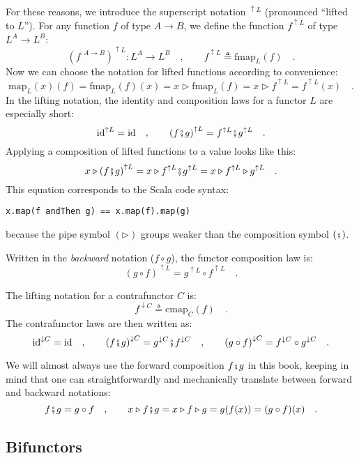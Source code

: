 For these reasons, we introduce the superscript notation $^{\uparrow L}$
(pronounced \textsf{``}lifted to $L$\textsf{''}). For any function $f$ of type $A\rightarrow B$,
we define the function $f^{\uparrow L}$ of type $L^{A}\rightarrow L^{B}$:
\[
(f^{:A\rightarrow B})^{\uparrow L}:L^{A}\rightarrow L^{B}\quad,\quad\quad f^{\uparrow L}\triangleq\text{fmap}_{L}(f)\quad.
\]
Now we can choose the notation for lifted functions according to convenience:
\[
\text{map}_{L}(x)(f)=\text{fmap}_{L}(f)(x)=x\triangleright\text{fmap}_{L}(f)=x\triangleright f^{\uparrow L}=f^{\uparrow L}(x)\quad.
\]
In the lifting notation,
the identity and composition laws for a functor $L$ are especially
short:
\[
\text{id}^{\uparrow L}=\text{id}\quad,\quad\quad\left(f\bef g\right)^{\uparrow L}=f^{\uparrow L}\bef g^{\uparrow L}\quad.
\]
Applying a composition of lifted functions to a value looks like this:
\[
x\triangleright\left(f\bef g\right)^{\uparrow L}=x\triangleright f^{\uparrow L}\bef g^{\uparrow L}=x\triangleright f^{\uparrow L}\triangleright g^{\uparrow L}\quad.
\]
This equation corresponds to the Scala code syntax:
\begin{lstlisting}
x.map(f andThen g) == x.map(f).map(g)
\end{lstlisting}
because the pipe symbol $\left(\triangleright\right)$ groups weaker
than the composition symbol $\left(\bef\right)$.

Written in the \emph{backward} notation ($f\circ g$), the functor
composition law is:
\[
\left(g\circ f\right)^{\uparrow L}=g^{\uparrow L}\circ f^{\uparrow L}\quad.
\]

The lifting notation for a contrafunctor $C$ is:
\[
f^{\downarrow C}\triangleq\text{cmap}_{C}(f)\quad.
\]
The contrafunctor laws are then written as:
\[
\text{id}^{\downarrow C}=\text{id}\quad,\quad\quad\left(f\bef g\right)^{\downarrow C}=g^{\downarrow C}\bef f^{\downarrow C}\quad,\quad\quad\left(g\circ f\right)^{\downarrow C}=f^{\downarrow C}\circ g^{\downarrow C}\quad.
\]

We will almost always use the forward composition $f\bef g$ in this
book, keeping in mind that one can straightforwardly and mechanically
translate between forward and backward notations:
\[
f\bef g=g\circ f\quad,\quad\quad x\triangleright f\bef g=x\triangleright f\triangleright g=g(f(x))=(g\circ f)(x)\quad.
\]


\subsection{Bifunctors\label{subsec:Bifunctors}}

